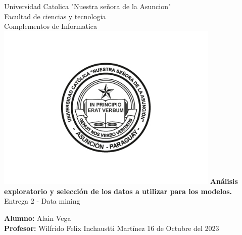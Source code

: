 \documentclass[12pt, letterpaper, spanish]{article}
\begin{document}
\begin{titlepage}
  \begin{center}
      \Large{Universidad Catolica "Nuestra señora de la Asuncion" \\
      Facultad de ciencias y tecnologia \\
      Complementos de Informatica}
      \includegraphics[width=0.8\textwidth]{UcaLogo.jpg}
      \LARGE{\textbf{Análisis exploratorio y selección de los datos 
      a utilizar para los modelos.}} \\
      \Large{Entrega 2 - Data mining}
      \vspace{1cm}
  \end{center}
      \large
      \textbf{Alumno: }Alain Vega \\
      \textbf{Profesor: }Wilfrido Felix Inchaustti Martínez
      \vfill
      \hfill{16 de Octubre del 2023}
\end{titlepage}

\newpage
\tableofcontents %
\newpage

\end{document}
